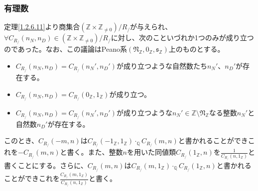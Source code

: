 \documentclass[dvipdfmx]{jsarticle}
\begin{document}
\subsubsection{有理数}%
\begin{dfn} 定理\ref{1.2.6.11}より商集合$\left( \mathbb{Z} \times \mathbb{Z}_{\neq 0} \right) /R_{/} $が与えられ、$\forall C_{R_{/}}\left( n_{N},n_{D} \right) \in \left( \mathbb{Z} \times \mathbb{Z}_{\neq 0} \right) /R_{/} $に対し、次のこといづれか1つのみが成り立つのであった。なお、この議論はPeano系$\left( \mathfrak{N}_{\mathbb{Z}},0_{\mathbb{Z}},\mathfrak{s}_{\mathbb{Z}} \right)$上のものとする。
\begin{itemize}
\item
  $C_{R_{/}}\left( n_{N},n_{D} \right) = C_{R_{/}}\left( n_{N}',n_{D}' \right)$が成り立つような自然数たち$n_{N}'$、$n_{D}'$が存在する。
\item
  $C_{R_{/}}\left( n_{N},n_{D} \right) = C_{R_{/}}\left( 0_{\mathbb{Z}},1_{\mathbb{Z}} \right)$が成り立つ。
\item
  $C_{R_{/}}\left( n_{N},n_{D} \right) = C_{R_{/}}\left( n_{N}',n_{D}' \right)$が成り立つような$n_{N}' \in \mathbb{Z} \setminus \mathfrak{N}_{\mathbb{Z}}$なる整数$n_{N}'$と自然数$n_{D}'$が存在する。
\end{itemize}
このとき、$C_{R_{/}}( - m,n)$は$C_{R_{/}}\left( - 1_{\mathbb{Z}},1_{\mathbb{Z}} \right) \cdot_{\mathbb{Q}}C_{R_{/}}(m,n)$と書かれることができこれを$- C_{R_{/}}(m,n)$と書く。また、整数$n$を用いた同値類$C_{R_{/}}\left( 1_{\mathbb{Z}},n \right)$を$\frac{1}{C_{R_{/}}\left( n,1_{\mathbb{Z}} \right)}$と書くことにする。さらに、$C_{R_{/}}(m,n)$は$C_{R_{/}}\left( m,1_{\mathbb{Z}} \right) \cdot_{\mathbb{Q}}C_{R_{/}}\left( 1_{\mathbb{Z}},n \right)$と書かれることができこれを$\frac{C_{R_{/}}\left( m,1_{\mathbb{Z}} \right)}{C_{R_{/}}\left( n,1_{\mathbb{Z}} \right)}$と書く。
\end{dfn}
\end{document}
